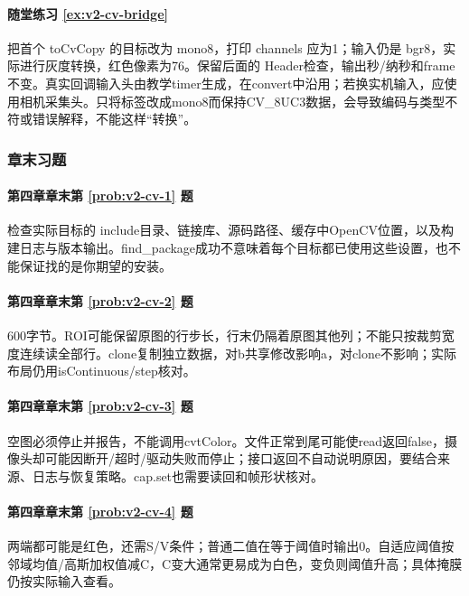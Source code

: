 \paragraph*{随堂练习 \ref{ex:v2-cv-bridge}}
\begin{solution}
把首个 toCvCopy 的目标改为 mono8，打印 channels 应为1；输入仍是 bgr8，实际进行灰度转换，红色像素为76。保留后面的 Header检查，输出秒/纳秒和frame不变。真实回调输入头由教学timer生成，在convert中沿用；若换实机输入，应使用相机采集头。只将标签改成mono8而保持CV\_8UC3数据，会导致编码与类型不符或错误解释，不能这样“转换”。
\end{solution}

\subsubsection*{章末习题}
\paragraph*{第四章章末第 \ref{prob:v2-cv-1} 题}
\begin{solution}
检查实际目标的 include目录、链接库、源码路径、缓存中OpenCV位置，以及构建日志与版本输出。find\_package成功不意味着每个目标都已使用这些设置，也不能保证找的是你期望的安装。
\end{solution}
\paragraph*{第四章章末第 \ref{prob:v2-cv-2} 题}
\begin{solution}
600字节。ROI可能保留原图的行步长，行末仍隔着原图其他列；不能只按裁剪宽度连续读全部行。clone复制独立数据，对b共享修改影响a，对clone不影响；实际布局仍用isContinuous/step核对。
\end{solution}
\paragraph*{第四章章末第 \ref{prob:v2-cv-3} 题}
\begin{solution}
空图必须停止并报告，不能调用cvtColor。文件正常到尾可能使read返回false，摄像头却可能因断开/超时/驱动失败而停止；接口返回不自动说明原因，要结合来源、日志与恢复策略。cap.set也需要读回和帧形状核对。
\end{solution}
\paragraph*{第四章章末第 \ref{prob:v2-cv-4} 题}
\begin{solution}
两端都可能是红色，还需S/V条件；普通二值在等于阈值时输出0。自适应阈值按邻域均值/高斯加权值减C，C变大通常更易成为白色，变负则阈值升高；具体掩膜仍按实际输入查看。
\end{solution}
